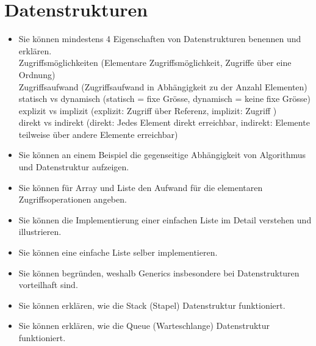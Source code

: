 \documentclass[a4paper, 10pt]{article}
\begin{document}
\section{Datenstrukturen}
\begin{itemize}
  \item Sie können mindestens 4 Eigenschaften von Datenstrukturen benennen und erklären. \\
        Zugriffsmöglichkeiten (Elementare Zugriffsmöglichkeit, Zugriffe über eine Ordnung) \\
        Zugriffsaufwand (Zugriffsaufwand in Abhängigkeit zu der Anzahl Elementen) \\
        statisch vs dynamisch (statisch = fixe Grösse, dynamisch = keine fixe Grösse) \\
        explizit vs implizit (explizit: Zugriff über Referenz, implizit: Zugriff ) \\
        direkt vs indirekt (direkt: Jedes Element direkt erreichbar, indirekt: Elemente teilweise über andere Elemente erreichbar)
  \item Sie können an einem Beispiel die gegenseitige Abhängigkeit von Algorithmus und Datenstruktur aufzeigen. \\
        
  \item Sie können für Array und Liste den Aufwand für die elementaren Zugriffsoperationen angeben. \\
        
  \item Sie können die Implementierung einer einfachen Liste im Detail verstehen und illustrieren. \\
        
  \item Sie können eine einfache Liste selber implementieren. \\
        
  \item Sie können begründen, weshalb Generics insbesondere bei Datenstrukturen vorteilhaft sind. \\
        
  \item Sie können erklären, wie die Stack (Stapel) Datenstruktur funktioniert. \\
        
  \item Sie können erklären, wie die Queue (Warteschlange) Datenstruktur funktioniert. \\
        

\end{itemize}
\end{document}
